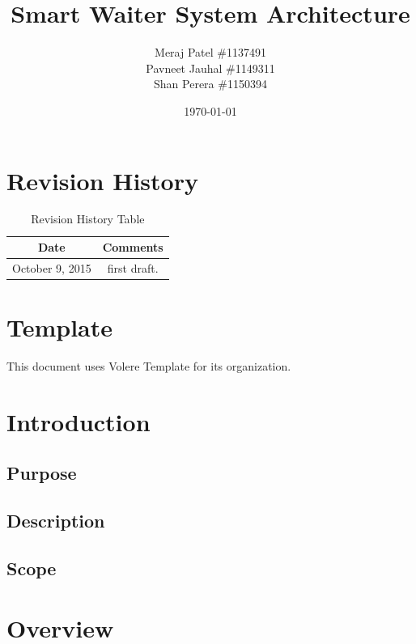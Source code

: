 \documentclass[12pt, titlepage]{article}
\begin{document}
\title{Smart Waiter System Architecture} 
\author{Meraj Patel \#1137491 \\ Pavneet Jauhal \#1149311\\ Shan Perera \#1150394}
\date{\today}
\maketitle

\tableofcontents 

\listoffigures

\listoftables

\begin{table}[H]
\section*{Revision History}
\begin{tabular}{|c|c|}
\hline
\textbf{Date}  & \textbf{Comments} \\ \hline
October 9, 2015 &  first draft. \\ 
\hline
\end{tabular}
\caption{Revision History Table}
\end{table}

\section*{Template}
This document uses Volere Template for its organization.
\pagebreak

\section{Introduction}

\subsection{Purpose}

\subsection{Description}

\subsection{Scope}

\section{Overview}
\end{document}
